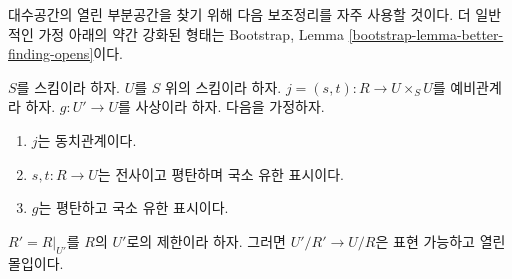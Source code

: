 \noindent
대수공간의 열린 부분공간을 찾기 위해 다음 보조정리를 자주 사용할 것이다.
더 일반적인 가정 아래의 약간 강화된 형태는 Bootstrap, Lemma
\ref{bootstrap-lemma-better-finding-opens}이다.

\begin{lemma}
\label{lemma-finding-opens}
$S$를 스킴이라 하자.
$U$를 $S$ 위의 스킴이라 하자.
$j = (s, t) : R \to U \times_S U$를 예비관계라 하자.
$g : U' \to U$를 사상이라 하자.
다음을 가정하자.
\begin{enumerate}
\item $j$는 동치관계이다.
\item $s, t : R \to U$는 전사이고 평탄하며 국소 유한 표시이다.
\item $g$는 평탄하고 국소 유한 표시이다.
\end{enumerate}
$R' = R|_{U'}$를 $R$의 $U'$로의 제한이라 하자. 그러면
$U'/R' \to U/R$은 표현 가능하고 열린 몰입이다.
\end{lemma}

